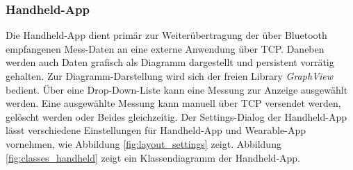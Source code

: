 \subsubsection{Handheld-App}
Die Handheld-App dient primär zur Weiterübertragung der über Bluetooth empfangenen Mess-Daten an eine externe Anwendung über TCP. Daneben werden auch Daten grafisch als Diagramm dargestellt und persistent vorrätig gehalten. Zur Diagramm-Darstellung wird sich der freien Library \textit{GraphView}\cite{graphview} bedient. Über eine Drop-Down-Liste kann eine Messung zur Anzeige ausgewählt werden. Eine ausgewählte Messung kann manuell über TCP versendet werden, gelöscht werden oder Beides gleichzeitig. Der Settings-Dialog der Handheld-App lässt verschiedene Einstellungen für Handheld-App und Wearable-App vornehmen, wie Abbildung \ref{fig:layout_settings} zeigt. Abbildung \ref{fig:classes_handheld} zeigt ein Klassendiagramm der Handheld-App.\\

